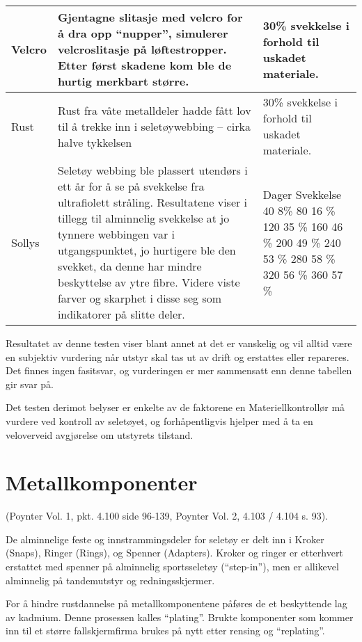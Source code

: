 \begin{table}
\begin{tabular}{ | l | l | l | }
		\hline
		Velcro & Gjentagne slitasje med velcro for å dra opp ``nupper'', simulerer velcroslitasje på løftestropper. Etter først skadene kom ble de hurtig merkbart større. & 30\% svekkelse i forhold til uskadet materiale. \\
		\hline
		Rust & Rust fra våte metalldeler hadde fått lov til å trekke inn i seletøywebbing – cirka halve tykkelsen & 30\% svekkelse i forhold til uskadet materiale. \\
		\hline
		Sollys &
		Seletøy webbing ble plassert utendørs i ett år for å se på svekkelse fra ultrafiolett stråling.
		Resultatene viser i tillegg til alminnelig svekkelse at jo tynnere webbingen var i utgangspunktet, jo hurtigere ble den svekket, da denne har mindre beskyttelse av ytre fibre.
		Videre viste farver og skarphet i disse seg som indikatorer på slitte deler. &
		Dager Svekkelse
		40 8\%
		80 16 \%
		120 35 \%
		160 46 \%
		200 49 \%
		240 53 \%
		280 58 \%
		320 56 \%
		360 57 \% \\
		\hline
	\end{tabular}
\end{table}

Resultatet av denne testen viser blant annet at det er vanskelig og vil alltid være en subjektiv vurdering når utstyr skal tas ut av drift og erstattes eller repareres. Det finnes ingen fasitsvar, og vurderingen er mer sammensatt enn denne tabellen gir svar på.

Det testen derimot belyser er enkelte av de faktorene en Materiellkontrollør må vurdere ved kontroll av seletøyet, og forhåpentligvis hjelper med å ta en veloverveid avgjørelse om utstyrets tilstand.

\section{Metallkomponenter}
(Poynter Vol. 1, pkt. 4.100 side 96-139, Poynter Vol. 2, 4.103 / 4.104 s. 93).

De alminnelige feste og innstrammingsdeler for seletøy er delt inn i Kroker (Snaps), Ringer (Rings), og Spenner (Adapters). Kroker og ringer er etterhvert erstattet med spenner på alminnelig sportsseletøy (``step-in''), men er allikevel alminnelig på tandemutstyr og redningsskjermer.

For å hindre rustdannelse på metallkomponentene påføres de et beskyttende lag av kadmium. Denne prosessen kalles ``plating''. Brukte komponenter som kommer inn til et større fallskjermfirma brukes på nytt etter rensing og ``replating''.

